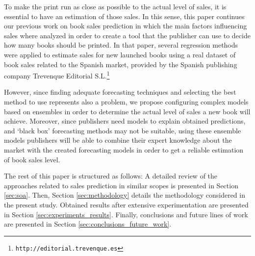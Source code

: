 \documentclass[a4paper,10pt,onecolumn,preprint,3p]{elsarticle}
\begin{document}
To make the print run as close as possible to the actual level of sales, it is 
essential to have an estimation of those sales. 
In this sense, this paper continues our previous work on book sales prediction 
\cite{Castillo2016books} in which the main factors influencing sales where 
analyzed in order to create a tool that the publisher can use to decide how many 
books should be printed.
In that paper, several regression methods were applied to estimate sales for new launched books using a real dataset of book sales related to the Spanish market, provided by the Spanish publishing company Trevenque Editorial S.L.\footnote{\tt http://editorial.trevenque.es}

However, since finding adequate forecasting techniques and selecting the best method 
to use represents also a problem, we propose configuring complex models based on
ensembles \cite{Qiu2014} in order to determine the actual 
level of sales a new book will achieve.
Moreover, since publishers need models to explain obtained predictions, and 
`black box' forecasting methods may not be suitable, using these ensemble 
models publishers will be able to combine their expert knowledge about the 
market with the created forecasting models in order to get a reliable estimation 
of book sales level.


The rest of this paper is structured as follows: 
A detailed review of the approaches related to sales prediction in similar scopes is presented in Section \ref{sec:soa}.
Then, Section \ref{sec:methodology} details the methodology considered in the present study. 
Obtained results after extensive experimentation are presented in Section \ref{sec:experiments_results}.
Finally, conclusions and future lines of work are presented in Section \ref{sec:conclusions_future_work}.
\end{document}

